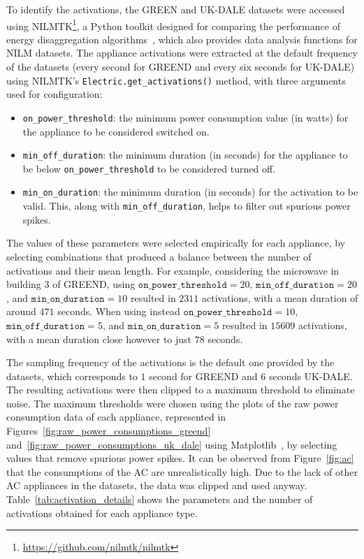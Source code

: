 To identify the activations, the GREEN and UK-DALE datasets were accessed using NILMTK\footnote{\url{https://github.com/nilmtk/nilmtk}}, a Python toolkit designed for comparing the performance of energy disaggregation algorithms~\parencite{batraItDifferentInsights2013}, which also provides data analysis functions for NILM datasets. The appliance activations were extracted at the default frequency of the datasets (every second for GREEND and every six seconds for UK-DALE) using NILMTK's \texttt{Electric.get\_activations()} method, with three arguments used for configuration:
\begin{itemize}
  \item \texttt{on\_power\_threshold}: the minimum power consumption value (in watts) for the appliance to be considered switched on.
  \item \texttt{min\_off\_duration}: the minimum duration (in seconds) for the appliance to be below \texttt{on\_power\_threshold} to be considered turned off.
  \item \texttt{min\_on\_duration}: the minimum duration (in seconds) for the activation to be valid. This, along with \texttt{min\_off\_duration}, helps to filter out spurious power spikes.
\end{itemize}
The values of these parameters were selected empirically for each appliance, by selecting combinations that produced a balance between the number of activations and their mean length. For example, considering the microwave in building 3 of GREEND, using $\texttt{on\_power\_threshold} = 20$, $\texttt{min\_off\_duration} = 20$, and $\texttt{min\_on\_duration} = 10$ resulted in $2311$ activations, with a mean duration of around $471$ seconds. When using instead $\texttt{on\_power\_threshold} = 10$, $\texttt{min\_off\_duration} = 5$, and $\texttt{min\_on\_duration} = 5$ resulted in $15609$ activations, with a mean duration close however to just $78$ seconds.

\newpage

The sampling frequency of the activations is the default one provided by the datasets, which corresponds to $1$ second for GREEND and $6$ seconds UK-DALE. The resulting activations were then clipped to a maximum threshold to eliminate noise. The maximum thresholds were chosen using the plots of the raw power consumption data of each appliance, represented in Figures~\ref{fig:raw_power_consumptions_greend} and~\ref{fig:raw_power_consumptions_uk_dale} using Matplotlib~\parencite{hunterMatplotlib2DGraphics2007}, by selecting values that remove spurious power spikes. It can be observed from Figure~\ref{fig:ac} that the consumptions of the AC are unrealistically high. Due to the lack of other AC appliances in the datasets, the data was clipped and used anyway. Table~\ref{tab:activation_details} shows the parameters and the number of activations obtained for each appliance type.

